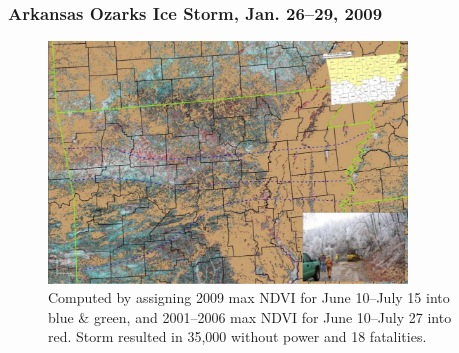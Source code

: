 \begin{frame}
 \frametitle{Arkansas Ozarks Ice Storm, Jan. 26--29, 2009}
 \vskip-0.15in
 \begin{figure}
  \begin{center}
   \includegraphics[width=0.85\textwidth]{figures/arkansasicestorm3slide} \\
   \vbox{\small Computed by assigning 2009 max NDVI for June 10--July 15 into blue \& green, and 2001--2006 max NDVI for June 10--July 27 into red.  Storm resulted in 35,000 without power and 18 fatalities.}
  \end{center}
  \label{fig:arkansasicestorm3slide}
 \end{figure}
\end{frame}

